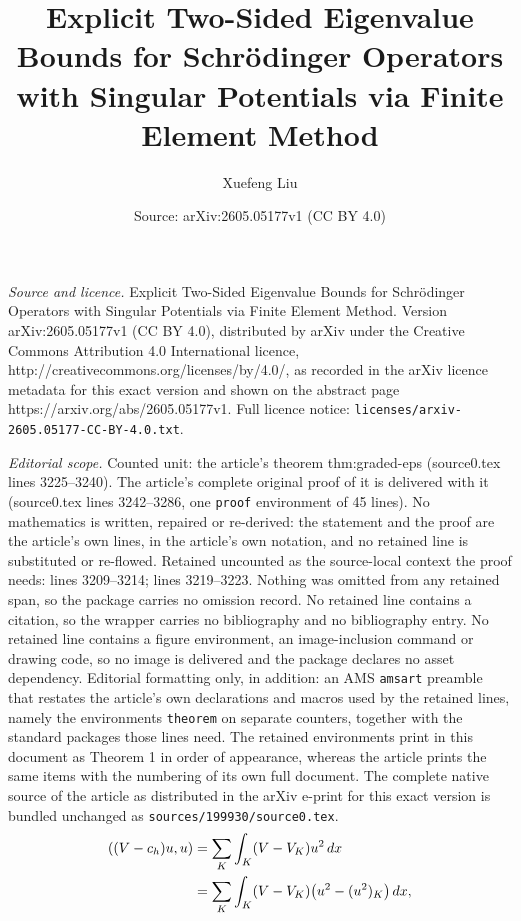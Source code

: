 \documentclass[10pt,a4paper]{amsart}
\title{Explicit Two-Sided Eigenvalue Bounds for Schr\"{o}dinger Operators with Singular Potentials via Finite Element Method}
\author{Xuefeng Liu}
\date{Source: arXiv:2605.05177v1 (CC BY 4.0)}
\begin{document}
\maketitle

\noindent\emph{Source and licence.} Explicit Two-Sided Eigenvalue Bounds for Schr\"{o}dinger Operators with Singular Potentials via Finite Element Method. Version arXiv:2605.05177v1 (CC BY 4.0), distributed by arXiv under the Creative Commons Attribution 4.0 International licence, http://creativecommons.org/licenses/by/4.0/, as recorded in the arXiv licence metadata for this exact version and shown on the abstract page https://arxiv.org/abs/2605.05177v1. Full licence notice: \texttt{licenses/arxiv-2605.05177-CC-BY-4.0.txt}.\par\smallskip

\noindent\textit{Editorial scope.} Counted unit: the article's theorem thm:graded-eps (source0.tex lines 3225--3240). The article's complete original proof of it is delivered with it (source0.tex lines 3242--3286, one \texttt{proof} environment of 45 lines). No mathematics is written, repaired or re-derived: the statement and the proof are the article's own lines, in the article's own notation, and no retained line is substituted or re-flowed.  Retained uncounted as the source-local context the proof needs: lines 3209--3214; lines 3219--3223.  Nothing was omitted from any retained span, so the package carries no omission record.  No retained line contains a citation, so the wrapper carries no bibliography and no bibliography entry.  No retained line contains a figure environment, an image-inclusion command or drawing code, so no image is delivered and the package declares no asset dependency.  Editorial formatting only, in addition: an AMS \texttt{amsart} preamble that restates the article's own declarations and macros used by the retained lines, namely the environments \texttt{theorem} on separate counters, together with the standard packages those lines need.  The retained environments print in this document as Theorem 1 in order of appearance, whereas the article prints the same items with the numbering of its own full document.  The complete native source of the article as distributed in the arXiv e-print for this exact version is bundled unchanged as \texttt{sources/199930/source0.tex}.
\begin{align}
((V-c_h)u,u)
&=\sum_{K}\int_K (V-V_K)u^2\,dx \notag\\
&=\sum_K \int_K (V-V_K)\bigl(u^2-(u^2)_K\bigr)\,dx,
\label{eq:Vchuident}
\end{align}
\end{document}

